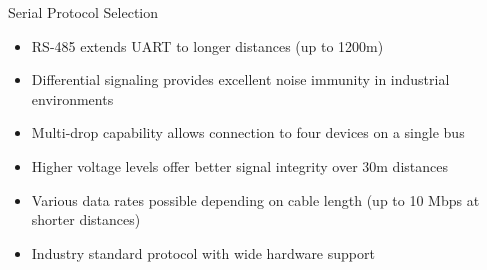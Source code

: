 \begin{example2}{Serial Protocol Selection}
   \begin{itemize}
     \item RS-485 extends UART to longer distances (up to 1200m)
     \item Differential signaling provides excellent noise immunity in industrial environments
     \item Multi-drop capability allows connection to four devices on a single bus
     \item Higher voltage levels offer better signal integrity over 30m distances
     \item Various data rates possible depending on cable length (up to 10 Mbps at shorter distances)
     \item Industry standard protocol with wide hardware support
   \end{itemize}
\end{example2}